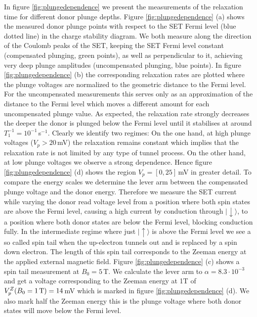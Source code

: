 \documentclass[%
 reprint,
 amsmath,amssymb,
 aps,
]{revtex4-1}
\newcommand {\ket} [1] {|{ #1 \rangle}}
\begin{document}
In figure \ref{fig:plungedependence} we present the measurements of the relaxation time for different donor plunge depths. Figure \ref{fig:plungedependence} (a) shows the measured donor plunge points with respect to the SET Fermi level (blue dotted line) in the charge stability diagram. We both measure along the direction of the Coulomb peaks of the SET, keeping the SET Fermi level constant (compensated plunging, green points), as well as perpendicular to it, achieving very deep plunge amplitudes (uncompensated plunging, blue points). In figure \ref{fig:plungedependence} (b) the corresponding relaxation rates are plotted where the plunge voltages are normalized to the geometric distance to the Fermi level. For the uncompensated measurements this serves only as an approximation of the distance to the Fermi level which moves a different amount for each uncompensated plunge value. 
As expected, the relaxation rate strongly decreases the deeper the donor is plunged below the Fermi level until it stabilises at around $T_1^{-1}=10^{-1}\,$s$^{-1}$. Clearly we identify two regimes: On the one hand, at high plunge voltages ($V_p>20\,$mV) the relaxation remains constant which implies that the relaxation rate is not limited by any type of tunnel process. On the other hand, at low plunge voltages we observe a strong dependence. Hence figure \ref{fig:plungedependence} (d) shows the region $V_p=[0,25]\,$mV in greater detail. 
To compare the energy scales we determine the lever arm between the compensated plunge voltage and the donor energy. Therefore we measure the SET current while varying the donor read voltage level from a position where both spin states are above the Fermi level, causing a high current by conduction through $\ket{\downarrow}$, to a position where both donor states are below the Fermi level, blocking conduction fully. In the intermediate regime where just $\ket{\uparrow}$ is above the Fermi level we see a so called spin tail when the up-electron tunnels out and is replaced by a spin down electron. The length of this spin tail corresponds to the Zeeman energy at the applied external magnetic field. Figure \ref{fig:plungedependence} (c) shows a spin tail measurement at $B_0=5\,$T. We calculate the lever arm to $\alpha=8.3\cdot 10^{-3}$ and get a voltage corresponding to the Zeeman energy at 1T of $V_p^{Z}(B_0=1\,\rm{T})=14\,$mV which is marked in figure \ref{fig:plungedependence} (d). We also mark half the Zeeman energy this is the plunge voltage where both donor states will move below the Fermi level. 
\end{document}
